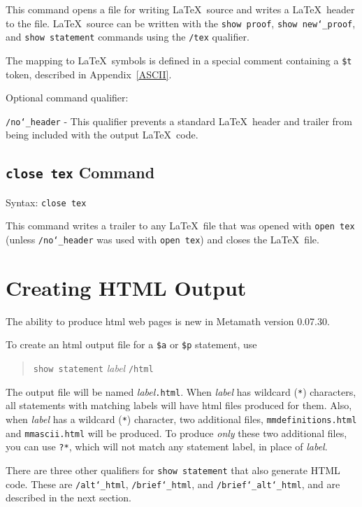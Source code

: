 This command opens a file for writing \LaTeX\
source and writes a \LaTeX\ header to the file.
\LaTeX\ source can be written with the \texttt{show proof}, \texttt{show
new{\char`\_}proof}, and \texttt{show statement} commands using the
\texttt{/tex} qualifier.

The mapping to \LaTeX\ symbols is defined in a special comment
containing a \texttt{\$t} token, described in Appendix~\ref{ASCII}.


Optional command qualifier:

    \texttt{/no{\char`\_}header} - This qualifier prevents a standard
        \LaTeX\ header and trailer
        from being included with the output \LaTeX\ code.


\subsection{\texttt{close tex} Command}
Syntax:  \texttt{close tex}

This command writes a trailer to any \LaTeX\ file
that was opened with \texttt{open tex} (unless
\texttt{/no{\char`\_}header} was used with \texttt{open tex}) and closes
the \LaTeX\ file.


\section{Creating HTML Output}\label{htmlout}

The ability to produce {\sc html} web pages is new in Metamath version
0.07.30.

To create an {\sc html} output file for a \texttt{\$a} or \texttt{\$p}
statement, use
\begin{quote}
    \texttt{show statement} {\em label} \texttt{/html}
\end{quote}
The output file will be named {\em label}\texttt{.html}.  When {\em
label} has wildcard (\texttt{*}) characters, all statements with
matching labels will have {\sc html} files produced for them.  Also,
when {\em label} has a wildcard (\texttt{*}) character, two additional
files, \texttt{mmdefinitions.html} and \texttt{mmascii.html} will be
produced.  To produce {\em only} these two additional files, you can use
\texttt{?*}, which will not match any statement label, in place of {\em
label}.

There are three other qualifiers for \texttt{show statement} that also
generate {\sc HTML} code.  These are \texttt{/alt{\char`\_}html},
\texttt{/brief{\char`\_}html}, and
\texttt{/brief{\char`\_}alt{\char`\_}html}, and are described in the
next section.

